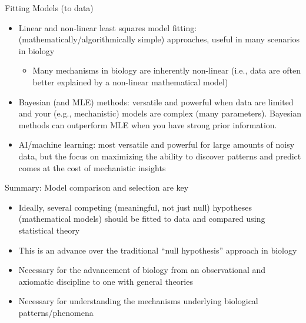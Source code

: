\documentclass[xcolor=x11names,compress, handout]{beamer}
\renewcommand{\(}{\begin{columns}}
\renewcommand{\)}{\end{columns}}
\newcommand{\<}[1]{\begin{column}{#1}}
\renewcommand{\>}{\end{column}}
\begin{document}
\begin{frame}{Fitting Models (to data)}

\begin{itemize} \itemsep12pt
	
\item Linear and non-linear least squares model fitting: (mathematically/algorithmically simple) approaches, useful in many scenarios in biology
\begin{itemize}
	\item Many mechanisms in biology are inherently non-linear (i.e., data are often better explained by a non-linear mathematical model)
\end{itemize} 

\item Bayesian (and MLE) methods: versatile and powerful when data are limited and your (e.g., mechanistic) models are complex (many parameters). Bayesian methods can outperform MLE when you have strong prior information.

\item AI/machine learning: most versatile and powerful for large amounts of noisy data, but the focus on maximizing the ability to discover patterns and predict comes at the cost of mechanistic insights


\end{itemize}

\end{frame}


\begin{frame}{Summary: Model comparison and selection are key}

\begin{itemize}[<+->]\itemsep12pt
	\item Ideally, several competing (meaningful, not just null) hypotheses (mathematical models) should be fitted to data and compared using statistical theory
	\item This is an advance over the traditional ``null hypothesis'' approach in biology
	\item Necessary for the advancement of biology from an observational and axiomatic discipline to one with general theories
	\item Necessary for understanding the mechanisms underlying biological patterns/phenomena
\end{itemize}
 
 \end{frame}
  
\end{document}
